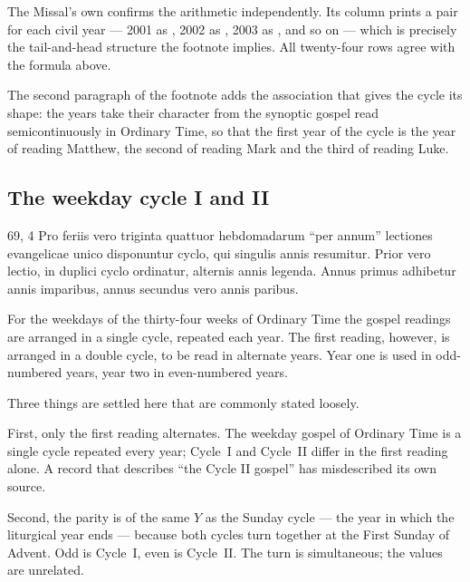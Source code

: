 The Missal's own  confirms the arithmetic independently. Its  column prints a pair for each civil year --- 2001 as , 2002 as ,
2003 as , and so on --- which is precisely the tail-and-head structure the footnote
implies. All twenty-four rows agree with the formula above.

The second paragraph of the footnote adds the association that gives the cycle its shape: the years
take their character from the synoptic gospel read semicontinuously in Ordinary Time, so that the
first year of the cycle is the year of reading Matthew, the second of reading Mark and the third of
reading Luke.

\subsection{The weekday cycle I and II}

\begin{normtext}{  69, 4}
Pro feriis vero triginta quattuor hebdomadarum ``per annum'' lectiones evangelicae unico disponuntur
cyclo, qui singulis annis resumitur. Prior vero lectio, in duplici cyclo ordinatur, alternis annis
legenda. Annus primus adhibetur annis imparibus, annus secundus vero annis paribus.
\end{normtext}

\begin{workingrendering}
For the weekdays of the thirty-four weeks of Ordinary Time the gospel readings are arranged in a
single cycle, repeated each year. The first reading, however, is arranged in a double cycle, to be
read in alternate years. Year one is used in odd-numbered years, year two in even-numbered years.
\end{workingrendering}

Three things are settled here that are commonly stated loosely.

First, only the first reading alternates. The weekday gospel of Ordinary Time is a single cycle
repeated every year; Cycle~I and Cycle~II differ in the first reading alone. A record that describes
``the Cycle II gospel'' has misdescribed its own source.

Second, the parity is of the same $Y$ as the Sunday cycle --- the year in which the liturgical year
ends --- because both cycles turn together at the First Sunday of Advent. Odd is Cycle~I, even is
Cycle~II. The turn is simultaneous; the values are unrelated.

